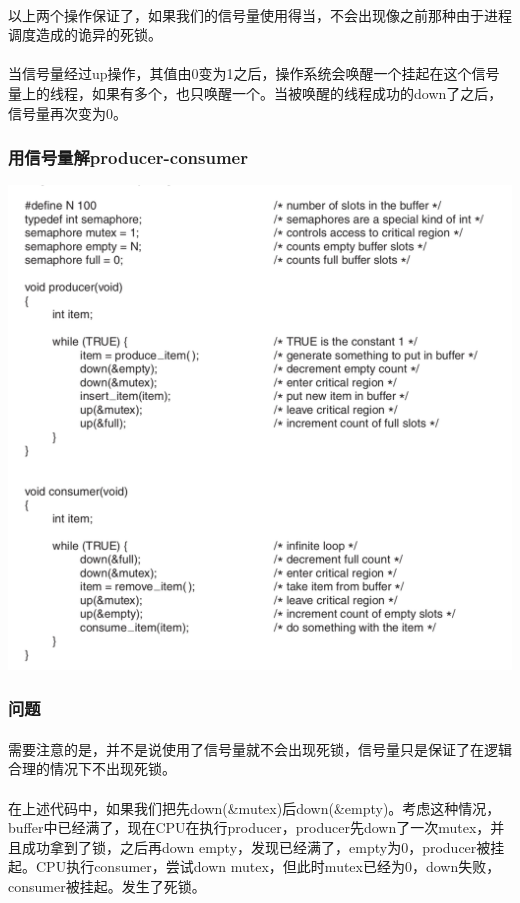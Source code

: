\documentclass[12pt]{article}
\begin{document}
\begin{CJK}{UTF8}{gbsn}
\paragraph{}以上两个操作保证了，如果我们的信号量使用得当，不会出现像之前那种由于进程调度造成的诡异的死锁。
\paragraph{}当信号量经过up操作，其值由0变为1之后，操作系统会唤醒一个挂起在这个信号量上的线程，如果有多个，也只唤醒一个。当被唤醒的线程成功的down了之后，信号量再次变为0。
\subsubsection{用信号量解producer-consumer}
\includegraphics[width=6in]{sig.png}
\subsubsection{问题}
\paragraph{}需要注意的是，并不是说使用了信号量就不会出现死锁，信号量只是保证了在逻辑合理的情况下不出现死锁。
\paragraph{}在上述代码中，如果我们把先down(\&mutex)后down(\&empty)。考虑这种情况，buffer中已经满了，现在CPU在执行producer，producer先down了一次mutex，并且成功拿到了锁，之后再down empty，发现已经满了，empty为0，producer被挂起。CPU执行consumer，尝试down mutex，但此时mutex已经为0，down失败，consumer被挂起。发生了死锁。


\end{CJK}
\end{document}
